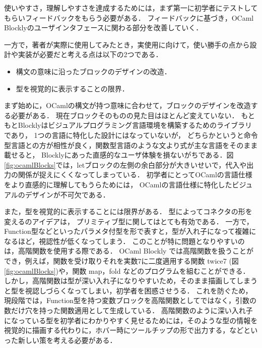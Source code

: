 使いやすさ，理解しやすさを達成するためには，まず第一に初学者にテストしてもらいフィードバックをもらう必要がある．
フィードバックに基づき，OCaml Blocklyのユーザインタフェースに関わる部分を改善していく．

一方で，著者が実際に使用してみたとき，実使用に向けて，使い勝手の点から設計や実装が必要だと考える点は以下の2つである．%
\begin{itemize}
 \item 構文の意味に沿ったブロックのデザインの改造．
 \item 型を視覚的に表示することの限界．
\end{itemize}

まず始めに，OCamlの構文が持つ意味に合わせて，ブロックのデザインを改造する必要がある．
現在ブロックそのものの見た目はほとんど変えていない．
もともとBlocklyはビジュアルプログラミング言語環境を構築するためのライブラリであり，
1つの言語に特化した設計にはなっていないが，
どちらかというと命令型言語との方が相性が良く，関数型言語のような文より式が主な言語をそのまま載せると，
Blocklyにあった直感的なユーザ体験を損ないがちである．図\ref{fig:ocamlBlocks}では，letブロックの左側の余白部分が大きいせいで，代入や出力の関係が捉えにくくなってしまっている．
初学者にとってOCamlの言語仕様をより直感的に理解してもうらためには，
OCamlの言語仕様に特化したビジュアルのデザインが不可欠である．

また，型を視覚的に表示することには限界がある．
型によってコネクタの形を変える\cite{Typed-Blockly}のアイデアは，
プリミティブ型に関してはとても有効である．
一方で，Function型などといったパラメタ付型を形で表すと，型が入れ子になって複雑になるほど，視認性が低くなってしまう．
このことが特に問題となりやすいのは，高階関数を使用する際である．
OCaml Blockly では高階関数を扱うことができ，例えば，関数を受け取りそれを実数7に二度適用する関数 twice7 (図\ref{fig:ocamlBlocks})や，関数 map，fold などのプログラムを組むことができる．
しかし，高階関数は型が深い入れ子になりやすいため，そのまま描画してしまうと型を視認しづらくなってしまい，初学者を困惑させうる．
これを防ぐため，現段階では，Function型を持つ変数ブロックを高階関数としてではなく，引数の数だけ穴を持った関数適用として生成している．
高階関数のように深い入れ子になっている型を初学者にわかりやすく見せるためには，そのような型の情報を視覚的に描画する代わりに，ホバー時にツールチップの形で出力する，などといった新しい策を考える必要がある．





